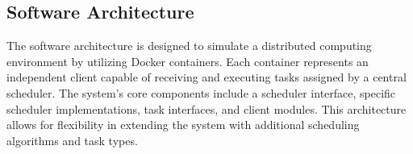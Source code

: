 \documentclass{article}
\begin{document}
\subsection{Software Architecture}
The software architecture is designed to simulate a distributed computing environment by utilizing Docker containers. Each container represents an independent client capable of receiving and executing tasks assigned by a central scheduler. The system's core components include a scheduler interface, specific scheduler implementations, task interfaces, and client modules. This architecture allows for flexibility in extending the system with additional scheduling algorithms and task types.

\begin{figure}[h!]
\centering
{}
\end{figure}
\end{document}
